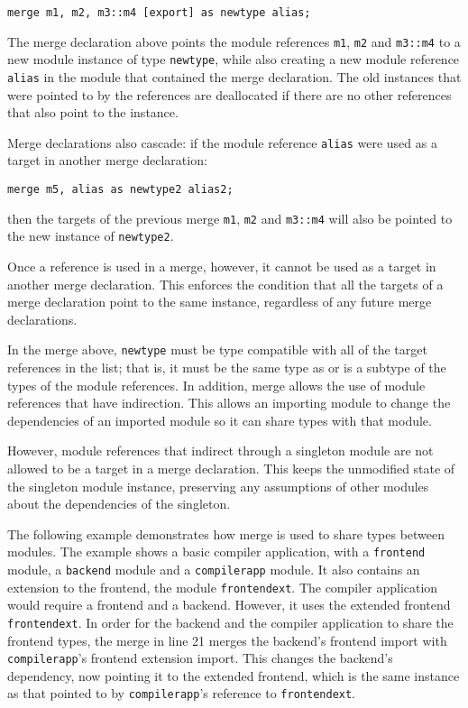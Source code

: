 \begin{lstlisting}
merge m1, m2, m3::m4 [export] as newtype alias;
\end{lstlisting}

The merge declaration above points the module references \texttt{m1}, \texttt{m2} and
\texttt{m3::m4} to a new module instance of type \texttt{newtype}, while also creating a
new module reference \texttt{alias} in the module that contained the merge declaration. 
The old instances that were pointed to by the references are deallocated if there are no
other references that also point to the instance.

Merge declarations also cascade: if the module reference \texttt{alias} were used as a target in
another merge declaration:

\begin{lstlisting}
merge m5, alias as newtype2 alias2;
\end{lstlisting}

then the targets of the previous merge \texttt{m1}, \texttt{m2} and \texttt{m3::m4} will also
be pointed to the new instance of \texttt{newtype2}. 

Once a reference is used in a merge, however,
it cannot be used as a target in another merge declaration. This enforces the condition that
all the targets of a merge declaration point to the same instance, regardless of any future merge
declarations.

In the merge above, \texttt{newtype} must be type compatible with all of the target references
in the list; that is, it must be the same type as or is a subtype of the types of the module
references. In addition, merge allows the use of module references that have indirection. This allows 
an importing module to change the dependencies of an imported module so it can share types with
that module. 

However, module references that indirect through a singleton module are not allowed to
be a target in a merge declaration. This keeps the unmodified state of the singleton module
instance, preserving any assumptions of other modules about the dependencies of the singleton.

The following example demonstrates how merge is used to share types between modules. The example
shows a basic compiler application, with a \texttt{frontend} module, a \texttt{backend} module
and a \texttt{compilerapp} module. It also contains an extension to the frontend, the module 
\texttt{frontendext}. The compiler application would require a frontend and a backend. 
However, it uses the extended frontend \texttt{frontendext}. In order for the backend and the
compiler application to share the frontend types, the merge in line 21 merges the backend's
frontend import with \texttt{compilerapp}'s frontend extension import. This changes the backend's
dependency, now pointing it to the extended frontend, which is the same instance as that pointed
to by \texttt{compilerapp}'s reference to \texttt{frontendext}.


